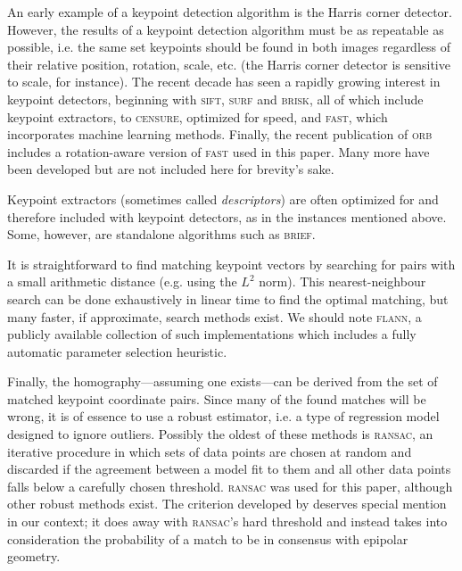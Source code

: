 \documentclass[floatfix,aip,rsi,reprint,graphicx]{revtex4-1}
\begin{document}
An early example of a keypoint detection algorithm is the Harris corner
detector\cite{Harris88}. However, the results of a keypoint detection algorithm
must be as repeatable as possible, i.e. the same set keypoints should be found
in both images regardless of their relative position, rotation, scale, etc. (the
Harris corner detector is sensitive to scale, for instance). The recent decade
has seen a rapidly growing interest in keypoint detectors, beginning with
\textsc{sift}\cite{Lowe04}, \textsc{surf}\cite{Bay08} and \textsc{brisk}\cite{Leutenegger11}, all of which
include keypoint extractors, to \textsc{censure}\cite{Agrawal08}, optimized for speed,
and \textsc{fast}\cite{Rosten05}, which incorporates machine learning methods. Finally,
the recent publication of \textsc{orb}\cite{Rublee11} includes a rotation-aware version
of \textsc{fast} used in this paper. Many more have been developed but are not included
here for brevity's sake.

Keypoint extractors (sometimes called \emph{descriptors}) are often optimized
for and therefore included with keypoint detectors, as in the instances
mentioned above. Some, however, are standalone algorithms such as
\textsc{brief}\cite{Calonder10}.

It is straightforward to find matching keypoint vectors by searching for pairs
with a small arithmetic distance (e.g. using the $L^2$ norm). This nearest-neighbour search
can be done exhaustively in linear time to find the optimal matching, but many
faster, if approximate, search methods exist. We should note \textsc{flann}\cite{Muja09},
a publicly available collection of such implementations which includes a fully
automatic parameter selection heuristic.

Finally, the homography---assuming one exists---can be derived from the set of
matched keypoint coordinate pairs. Since many of the found matches will be
wrong, it is of essence to use a robust estimator, i.e. a type of regression
model designed to ignore outliers. Possibly the oldest of these methods is
\textsc{ransac}\cite{Fischler81}, an iterative procedure in which sets of data points are
chosen at random and discarded if the agreement between a model fit to them and
all other data points falls below a carefully chosen threshold. \textsc{ransac} was used
for this paper, although other robust methods exist. The criterion developed by
\citet{Moisan04} deserves special mention in our context; it does away with
\textsc{ransac}'s hard threshold and instead takes into consideration the probability of
a match to be in consensus with epipolar geometry.
\end{document}
